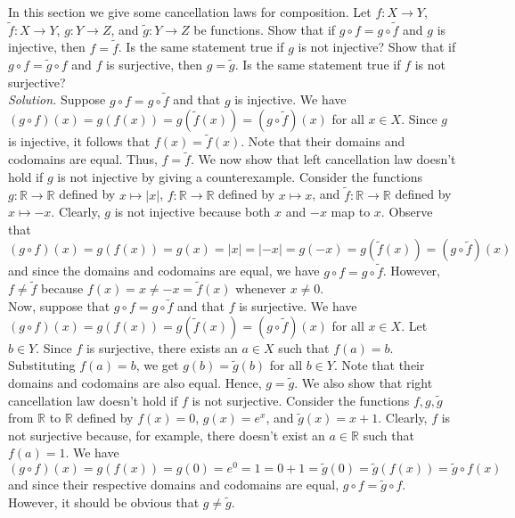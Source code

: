 \documentclass{amsart}
\theoremstyle{definition}
\newcommand{\R}{\mathbb{R}}
\newcommand{\soln}{\newline\textit{Solution.} }
\begin{document}
\subsubsection{} In this section we give some cancellation laws for composition. Let $f:X\to Y$, $\tilde{f}:X\to Y$, $g:Y\to Z$, and $\tilde{g}:Y\to Z$ be functions. Show that if $g\circ f=g\circ\tilde{f}$ and $g$ is injective, then $f=\tilde{f}$. Is the same statement true if $g$ is not injective? Show that if $g\circ f=\tilde{g}\circ f$ and $f$ is surjective, then $g=\tilde{g}$. Is the same statement true if $f$ is not surjective? \\
\soln Suppose $g\circ f=g\circ\tilde{f}$ and that $g$ is injective. We have $(g\circ f)(x)=g(f(x))=g(\tilde{f}(x))=(g\circ\tilde{f})(x)$ for all $x\in X$. Since $g$ is injective, it follows that $f(x)=\tilde{f}(x)$. Note that their domains and codomains are equal. Thus, $f=\tilde{f}$. We now show that left cancellation law doesn't hold if $g$ is not injective by giving a counterexample. Consider the functions $g:\R\to\R$ defined by $x\mapsto |x|$, $f:\R\to\R$ defined by $x\mapsto x$, and $\tilde{f}:\R\to\R$ defined by $x\mapsto -x$. Clearly, $g$ is not injective because both $x$ and $-x$ map to $x$. Observe that 
\[
(g\circ f)(x)=g(f(x))=g(x)=|x|=|-x|=g(-x)=g(\tilde{f}(x))=(g\circ \tilde{f})(x)
\]
and since the domains and codomains are equal, we have $g\circ f=g\circ\tilde{f}$. However, $f\neq \tilde{f}$ because $f(x)=x\neq -x=\tilde{f}(x)$ whenever $x\neq 0$. \\

Now, suppose that $g\circ f=g\circ\tilde{f}$ and that $f$ is surjective. We have $(g\circ f)(x)=g(f(x))=g(\tilde{f}(x))=(g\circ\tilde{f})(x)$ for all $x\in X$. Let $b\in Y$. Since $f$ is surjective, there exists an $a\in X$ such that $f(a)=b$. Substituting $f(a)=b$, we get $g(b)=\tilde{g}(b)$ for all $b\in Y$. Note that their domains and codomains are also equal. Hence, $g=\tilde{g}$. We also show that right cancellation law doesn't hold if $f$ is not surjective. Consider the functions $f,g,\tilde{g}$ from $\R$ to $\R$ defined by $f(x)=0$, $g(x)=e^x$, and $\tilde{g}(x)=x+1$. Clearly, $f$ is not surjective because, for example, there doesn't exist an $a\in\R$ such that $f(a)=1$. We have 
\[
(g\circ f)(x)=g(f(x))=g(0)=e^0=1=0+1=\tilde{g}(0)=\tilde{g}(f(x))=\tilde{g}\circ f(x)
\]
and since their respective domains and codomains are equal, $g\circ f=\tilde{g}\circ f$. However, it should be obvious that $g\neq \tilde{g}$. \\
\end{document}

